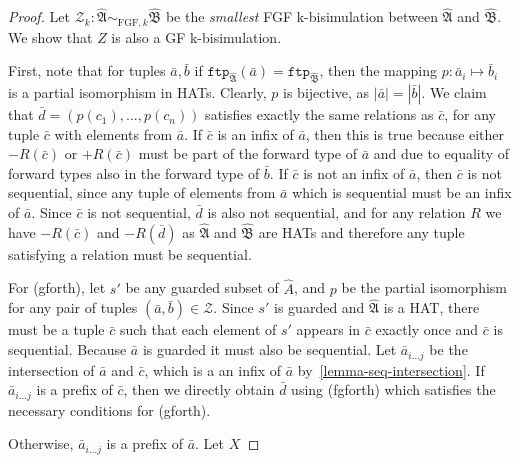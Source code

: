 \documentclass[draft]{scrartcl}
\theoremstyle{definition}
\begin{document}
\begin{proof}
Let $\mathcal{Z}_k: \mathfrak{\hat{A}} \sim_{\textrm{FGF},k} \mathfrak{\hat{B}}$ be the \emph{smallest} FGF k-bisimulation between $\mathfrak{\hat{A}}$ and $\mathfrak{\hat{B}}$. We show that $Z$ is also a GF k-bisimulation.

First, note that for tuples $\bar{a}, \bar{b}$ if $\mathtt{ftp}_\mathfrak{\hat{A}}(\bar{a}) = \mathtt{ftp}_\mathfrak{\hat{B}}$, then the mapping $p: \bar{a}_i \mapsto \bar{b}_i$ is a partial isomorphism in HATs.
Clearly, $p$ is bijective, as $|\bar{a}| = |\bar{b}|$.
We claim that $\bar{d} = (p(c_1), ..., p(c_n))$ satisfies exactly the same relations as $\bar{c}$, for any tuple $\bar{c}$ with elements from $\bar{a}$.
If $\bar{c}$ is an infix of $\bar{a}$, then this is true because either $-R(\bar{c})$ or $+R(\bar{c})$ must be part of the forward type of $\bar{a}$ and due to equality of forward types also in the forward type of $\bar{b}$.
If $\bar{c}$ is not an infix of $\bar{a}$, then $\bar{c}$ is not sequential, since any tuple of elements from $\bar{a}$ which is sequential must be an infix of $\bar{a}$.
Since $\bar{c}$ is not sequential, $\bar{d}$ is also not sequential, and for any relation $R$ we have $-R(\bar{c})$ and $-R(\bar{d})$ as $\mathfrak{\hat{A}}$ and $\mathfrak{\hat{B}}$ are HATs and therefore any tuple satisfying a relation must be sequential.

For (gforth), let $s'$ be any guarded subset of $\hat{A}$, and $p$ be the partial isomorphism for any pair of tuples $(\bar{a},\bar{b}) \in \mathcal{Z}$.
Since $s'$ is guarded and $\mathfrak{\hat{A}}$ is a HAT, there must be a tuple $\bar{c}$ such that each element of $s'$ appears in $\bar{c}$ exactly once and $\bar{c}$ is sequential.
Because $\bar{a}$ is guarded it must also be sequential.
Let $\bar{a}_{i\ldots{}j}$ be the intersection of $\bar{a}$ and $\bar{c}$, which is a an infix of $\bar{a}$ by~\cref{lemma-seq-intersection}.
If $\bar{a}_{i\ldots{}j}$ is a prefix of $\bar{c}$, then we directly obtain $\bar{d}$ using (fgforth) which satisfies the necessary conditions for (gforth).

Otherwise, $\bar{a}_{i\ldots{}j}$ is a prefix of $\bar{a}$.
Let $X_{}$


\end{proof}
\end{document}
